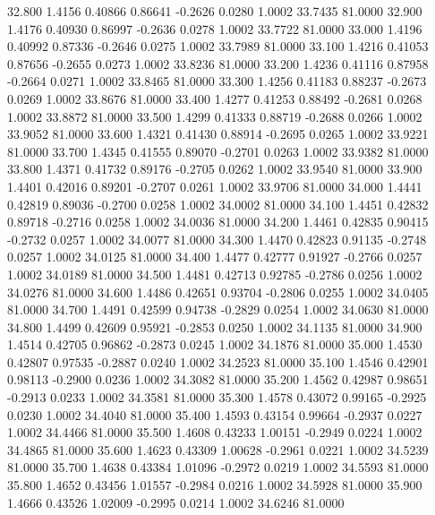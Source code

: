   32.800   1.4156   0.40866   0.86641  -0.2626   0.0280   1.0002  33.7435  81.0000
  32.900   1.4176   0.40930   0.86997  -0.2636   0.0278   1.0002  33.7722  81.0000
  33.000   1.4196   0.40992   0.87336  -0.2646   0.0275   1.0002  33.7989  81.0000
  33.100   1.4216   0.41053   0.87656  -0.2655   0.0273   1.0002  33.8236  81.0000
  33.200   1.4236   0.41116   0.87958  -0.2664   0.0271   1.0002  33.8465  81.0000
  33.300   1.4256   0.41183   0.88237  -0.2673   0.0269   1.0002  33.8676  81.0000
  33.400   1.4277   0.41253   0.88492  -0.2681   0.0268   1.0002  33.8872  81.0000
  33.500   1.4299   0.41333   0.88719  -0.2688   0.0266   1.0002  33.9052  81.0000
  33.600   1.4321   0.41430   0.88914  -0.2695   0.0265   1.0002  33.9221  81.0000
  33.700   1.4345   0.41555   0.89070  -0.2701   0.0263   1.0002  33.9382  81.0000
  33.800   1.4371   0.41732   0.89176  -0.2705   0.0262   1.0002  33.9540  81.0000
  33.900   1.4401   0.42016   0.89201  -0.2707   0.0261   1.0002  33.9706  81.0000
  34.000   1.4441   0.42819   0.89036  -0.2700   0.0258   1.0002  34.0002  81.0000
  34.100   1.4451   0.42832   0.89718  -0.2716   0.0258   1.0002  34.0036  81.0000
  34.200   1.4461   0.42835   0.90415  -0.2732   0.0257   1.0002  34.0077  81.0000
  34.300   1.4470   0.42823   0.91135  -0.2748   0.0257   1.0002  34.0125  81.0000
  34.400   1.4477   0.42777   0.91927  -0.2766   0.0257   1.0002  34.0189  81.0000
  34.500   1.4481   0.42713   0.92785  -0.2786   0.0256   1.0002  34.0276  81.0000
  34.600   1.4486   0.42651   0.93704  -0.2806   0.0255   1.0002  34.0405  81.0000
  34.700   1.4491   0.42599   0.94738  -0.2829   0.0254   1.0002  34.0630  81.0000
  34.800   1.4499   0.42609   0.95921  -0.2853   0.0250   1.0002  34.1135  81.0000
  34.900   1.4514   0.42705   0.96862  -0.2873   0.0245   1.0002  34.1876  81.0000
  35.000   1.4530   0.42807   0.97535  -0.2887   0.0240   1.0002  34.2523  81.0000
  35.100   1.4546   0.42901   0.98113  -0.2900   0.0236   1.0002  34.3082  81.0000
  35.200   1.4562   0.42987   0.98651  -0.2913   0.0233   1.0002  34.3581  81.0000
  35.300   1.4578   0.43072   0.99165  -0.2925   0.0230   1.0002  34.4040  81.0000
  35.400   1.4593   0.43154   0.99664  -0.2937   0.0227   1.0002  34.4466  81.0000
  35.500   1.4608   0.43233   1.00151  -0.2949   0.0224   1.0002  34.4865  81.0000
  35.600   1.4623   0.43309   1.00628  -0.2961   0.0221   1.0002  34.5239  81.0000
  35.700   1.4638   0.43384   1.01096  -0.2972   0.0219   1.0002  34.5593  81.0000
  35.800   1.4652   0.43456   1.01557  -0.2984   0.0216   1.0002  34.5928  81.0000
  35.900   1.4666   0.43526   1.02009  -0.2995   0.0214   1.0002  34.6246  81.0000
